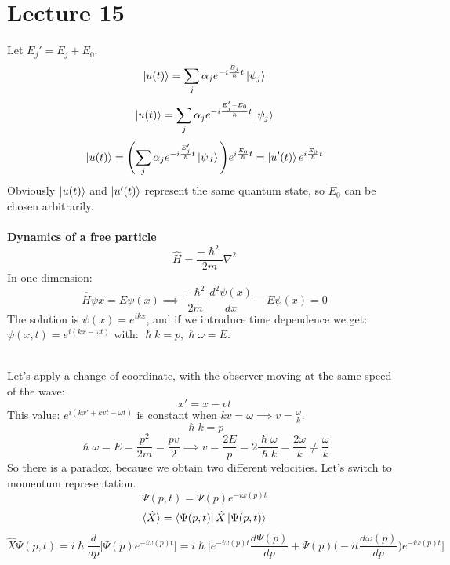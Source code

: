 \documentclass{article}
\begin{document}
\section{Lecture 15}
Let $E_j' = E_j + E_0$.
$$\ket{u(t)} = \sum_j \alpha_j e^{-i\frac{E_j}{\hslash}t} \ket{\psi_j}$$
$$\ket{u(t)} = \sum_j \alpha_j e^{-i\frac{E_j'-E_0}{\hslash}t} \ket{\psi_j} $$
$$\ket{u(t)} = \Biggl( \sum_j \alpha_j e^{-i\frac{E_j'}{\hslash}t} \ket{\psi_J} \Biggl) e^{i \frac{E_0}{\hslash}t} = \ket{u'(t)}  e^{i \frac{E_0}{\hslash}t} $$
Obviously $\ket{u(t)}$ and $\ket{u'(t)}$ represent the same quantum state, so $E_0$ can be chosen arbitrarily. \\ \\
\textbf{Dynamics of a free particle}
$$\hat{H} = \frac{-\hslash^2}{2m} \nabla^2$$
In one dimension:
$$\hat{H}\psi{x} = E \psi(x) \implies \frac{-\hslash^2}{2m} \frac{d^2 \psi(x)}{dx} - E \psi(x) = 0$$
The solution is $\psi(x) = e^{ikx}$, and if we introduce time dependence we get: $ \psi(x,t) = e^{i(kx-\omega t)}$ with: $ \hslash k = p, \hslash \omega = E.$

 \\
Let's apply a change of coordinate, with the observer moving at the same speed of the wave:
$$x'=x-vt$$
This value: $ e^{i(kx'+kvt-\omega t)}$ is constant when $kv = \omega \implies v = \frac{\omega}{k}$.
$$\hslash k = p$$
$$\hslash \omega = E= \frac{p^2}{2m} = \frac{pv}{2} \implies v = \frac{2E}{p} = 2\frac{\hslash \omega}{\hslash k} = \frac{2\omega}{k}\neq \frac{\omega}{k}$$
So there is a paradox, because we obtain two different velocities.
Let's switch to momentum representation.
$$\Psi(p,t) = \Psi(p) e^{-i\omega (p) t}$$
$$\langle \hat{X} \rangle = \bra{\Psi(p,t)} \hat{X} \ket{\Psi (p,t)}$$
$$\hat{X}\Psi(p,t) = i\hslash\frac{d}{dp} \biggl[ \Psi(p) e^{-i\omega(p)t} \biggl] = i \hslash \biggl[ e^{-i\omega (p) t} \frac{d \Psi(p)}{dp} + \Psi(p) \biggl(-it \frac{d\omega(p)}{dp} \biggl)  e^{-i \omega(p)t} \biggl] $$
\end{document}
